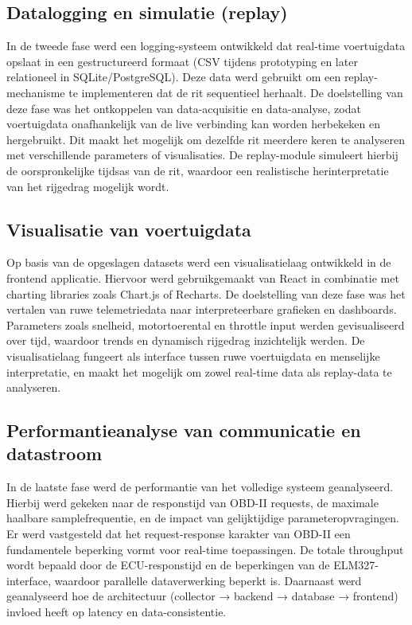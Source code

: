 \subsection{Datalogging en simulatie (replay)}

In de tweede fase werd een logging-systeem ontwikkeld dat real-time voertuigdata opslaat in een gestructureerd formaat (CSV tijdens prototyping en later relationeel in SQLite/PostgreSQL). Deze data werd gebruikt om een replay-mechanisme te implementeren dat de rit sequentieel herhaalt.
De doelstelling van deze fase was het ontkoppelen van data-acquisitie en data-analyse, zodat voertuigdata onafhankelijk van de live verbinding kan worden herbekeken en hergebruikt. Dit maakt het mogelijk om dezelfde rit meerdere keren te analyseren met verschillende parameters of visualisaties.
De replay-module simuleert hierbij de oorspronkelijke tijdsas van de rit, waardoor een realistische herinterpretatie van het rijgedrag mogelijk wordt.

\subsection{Visualisatie van voertuigdata}

Op basis van de opgeslagen datasets werd een visualisatielaag ontwikkeld in de frontend applicatie. Hiervoor werd gebruikgemaakt van React in combinatie met charting libraries zoals Chart.js of Recharts.
De doelstelling van deze fase was het vertalen van ruwe telemetriedata naar interpreteerbare grafieken en dashboards. Parameters zoals snelheid, motortoerental en throttle input werden gevisualiseerd over tijd, waardoor trends en dynamisch rijgedrag inzichtelijk werden.
De visualisatielaag fungeert als interface tussen ruwe voertuigdata en menselijke interpretatie, en maakt het mogelijk om zowel real-time data als replay-data te analyseren.

\subsection{Performantieanalyse van communicatie en datastroom}

In de laatste fase werd de performantie van het volledige systeem geanalyseerd. Hierbij werd gekeken naar de responstijd van OBD-II requests, de maximale haalbare samplefrequentie, en de impact van gelijktijdige parameteropvragingen.
Er werd vastgesteld dat het request-response karakter van OBD-II een fundamentele beperking vormt voor real-time toepassingen. De totale throughput wordt bepaald door de ECU-responstijd en de beperkingen van de ELM327-interface, waardoor parallelle dataverwerking beperkt is.
Daarnaast werd geanalyseerd hoe de architectuur (collector → backend → database → frontend) invloed heeft op latency en data-consistentie.

